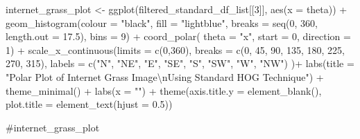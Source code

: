 \documentclass[
  letterpaper,
]{report}
\newenvironment{Shaded}{\begin{snugshade}}{\end{snugshade}}
\newcommand{\AttributeTok}[1]{\textcolor[rgb]{0.40,0.45,0.13}{#1}}
\newcommand{\CommentTok}[1]{\textcolor[rgb]{0.37,0.37,0.37}{#1}}
\newcommand{\DecValTok}[1]{\textcolor[rgb]{0.68,0.00,0.00}{#1}}
\newcommand{\FloatTok}[1]{\textcolor[rgb]{0.68,0.00,0.00}{#1}}
\newcommand{\FunctionTok}[1]{\textcolor[rgb]{0.28,0.35,0.67}{#1}}
\newcommand{\NormalTok}[1]{\textcolor[rgb]{0.00,0.23,0.31}{#1}}
\newcommand{\OtherTok}[1]{\textcolor[rgb]{0.00,0.23,0.31}{#1}}
\newcommand{\SpecialCharTok}[1]{\textcolor[rgb]{0.37,0.37,0.37}{#1}}
\newcommand{\StringTok}[1]{\textcolor[rgb]{0.13,0.47,0.30}{#1}}
\begin{document}
\begin{Shaded}
\begin{Highlighting}[]
\NormalTok{internet\_grass\_plot }\OtherTok{\textless{}{-}}
  \FunctionTok{ggplot}\NormalTok{(filtered\_standard\_df\_list[[}\DecValTok{3}\NormalTok{]], }
         \FunctionTok{aes}\NormalTok{(}\AttributeTok{x =}\NormalTok{ theta)) }\SpecialCharTok{+}
  \FunctionTok{geom\_histogram}\NormalTok{(}\AttributeTok{colour =} \StringTok{"black"}\NormalTok{, }
                 \AttributeTok{fill =} \StringTok{"lightblue"}\NormalTok{, }
                 \AttributeTok{breaks =} \FunctionTok{seq}\NormalTok{(}\DecValTok{0}\NormalTok{, }\DecValTok{360}\NormalTok{, }\AttributeTok{length.out =} \FloatTok{17.5}\NormalTok{),}
                 \AttributeTok{bins =} \DecValTok{9}\NormalTok{) }\SpecialCharTok{+}
  \FunctionTok{coord\_polar}\NormalTok{(}
    \AttributeTok{theta =} \StringTok{"x"}\NormalTok{, }
    \AttributeTok{start =} \DecValTok{0}\NormalTok{, }
    \AttributeTok{direction =} \DecValTok{1}\NormalTok{) }\SpecialCharTok{+}
  \FunctionTok{scale\_x\_continuous}\NormalTok{(}\AttributeTok{limits =} \FunctionTok{c}\NormalTok{(}\DecValTok{0}\NormalTok{,}\DecValTok{360}\NormalTok{),}
    \AttributeTok{breaks =} \FunctionTok{c}\NormalTok{(}\DecValTok{0}\NormalTok{, }\DecValTok{45}\NormalTok{, }\DecValTok{90}\NormalTok{, }\DecValTok{135}\NormalTok{, }\DecValTok{180}\NormalTok{, }\DecValTok{225}\NormalTok{, }\DecValTok{270}\NormalTok{, }\DecValTok{315}\NormalTok{), }
    \AttributeTok{labels =} \FunctionTok{c}\NormalTok{(}\StringTok{"N"}\NormalTok{, }\StringTok{"NE"}\NormalTok{, }\StringTok{"E"}\NormalTok{, }\StringTok{"SE"}\NormalTok{, }\StringTok{"S"}\NormalTok{, }\StringTok{"SW"}\NormalTok{, }\StringTok{"W"}\NormalTok{, }\StringTok{"NW"}\NormalTok{)}
\NormalTok{  )}\SpecialCharTok{+}
  \FunctionTok{labs}\NormalTok{(}\AttributeTok{title =} \StringTok{"Polar Plot of Internet Grass Image}\SpecialCharTok{\textbackslash{}n}\StringTok{Using Standard HOG Technique"}\NormalTok{) }\SpecialCharTok{+}
  \FunctionTok{theme\_minimal}\NormalTok{() }\SpecialCharTok{+}
  \FunctionTok{labs}\NormalTok{(}\AttributeTok{x =} \StringTok{""}\NormalTok{) }\SpecialCharTok{+}
  \FunctionTok{theme}\NormalTok{(}\AttributeTok{axis.title.y =} \FunctionTok{element\_blank}\NormalTok{(),}
        \AttributeTok{plot.title =} \FunctionTok{element\_text}\NormalTok{(}\AttributeTok{hjust =} \FloatTok{0.5}\NormalTok{))}

\CommentTok{\#internet\_grass\_plot}
\end{Highlighting}
\end{Shaded}
\end{document}
